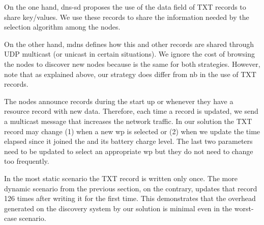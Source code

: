 On the one hand, \ac{dns-sd} proposes the use of the data field of TXT records to share key/values.
We use these records to share the information needed by the selection algorithm among the nodes.

On the other hand, \ac{mdns} defines how this and other records are shared through UDP multicast (or unicast in certain situations).
We ignore the cost of browsing the nodes to discover new nodes because is the same for both strategies.
However, note that as explained above, our strategy does differ from \acl{nb} in the use of TXT records.

The nodes announce records during the start up or whenever they have a resource record with new data.
Therefore, each time a record is updated, we send a multicast message that increases the network traffic.
In our solution the TXT record may change 
(1) when a new \ac{wp} is selected or
(2) when we update the time elapsed since it joined the \Space{} and its battery charge level.
The last two parameters need to be updated to select an appropriate \ac{wp} but they do not need to change too frequently.

In the most static scenario the TXT record is written only once.
The more dynamic scenario from the previous section, on the contrary, updates that record 126 times after writing it for the first time.
This demonstrates that the overhead generated on the discovery system by our solution is minimal even in the worst-case scenario.